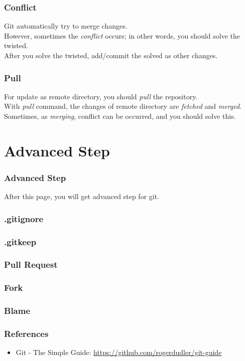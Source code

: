 \documentclass[aspectratio=169]{beamer}
\begin{document}
	\begin{frame}
		\frametitle{Conflict}
		Git automatically try to merge changes. \\
		However, sometimes the \textit{conflict} occurs; in other words, you should solve the twisted. \\
		After you solve the twisted, add/commit the solved as other changes. 
	\end{frame}

	\begin{frame}
		\frametitle{Pull}
		For update as remote directory, you should \textit{pull} the repository. \\
		With \textit{pull} command, the changes of remote directory are \textit{fetched} and \textit{merged}. \\
		Sometimes, as \textit{merging}, conflict can be occurred, and you should solve this. 
	\end{frame}

	\section{Advanced Step}
	\begin{frame}
		\frametitle{Advanced Step}
		After this page, you will get advanced step for git. 
	\end{frame}

	\begin{frame}
		\frametitle{.gitignore}
	\end{frame}

	\begin{frame}
		\frametitle{.gitkeep}
	\end{frame}

	\begin{frame}
		\frametitle{Pull Request}
	\end{frame}

	\begin{frame}
		\frametitle{Fork}
	\end{frame}

	\begin{frame}
		\frametitle{Blame}
	\end{frame}

	\begin{frame}
		\frametitle{References}
		
		\begin{itemize}
			\item Git - The Simple Guide: \url{https://github.com/rogerdudler/git-guide}
		\end{itemize}
	\end{frame}
\end{document}
